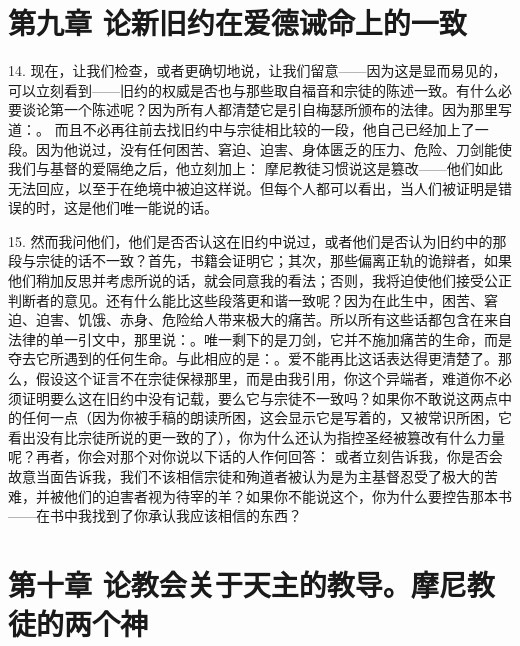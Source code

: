 
\section{第九章 论新旧约在爱德诫命上的一致}

14. 现在，让我们检查，或者更确切地说，让我们留意——因为这是显而易见的，可以立刻看到——旧约的权威是否也与那些取自福音和宗徒的陈述一致。有什么必要谈论第一个陈述呢？因为所有人都清楚它是引自梅瑟所颁布的法律。因为那里写道：。 而且不必再往前去找旧约中与宗徒相比较的一段，他自己已经加上了一段。因为他说过，没有任何困苦、窘迫、迫害、身体匮乏的压力、危险、刀剑能使我们与基督的爱隔绝之后，他立刻加上： 摩尼教徒习惯说这是篡改——他们如此无法回应，以至于在绝境中被迫这样说。但每个人都可以看出，当人们被证明是错误的时，这是他们唯一能说的话。\par

15. 然而我问他们，他们是否否认这在旧约中说过，或者他们是否认为旧约中的那段与宗徒的话不一致？首先，书籍会证明它；其次，那些偏离正轨的诡辩者，如果他们稍加反思并考虑所说的话，就会同意我的看法；否则，我将迫使他们接受公正判断者的意见。还有什么能比这些段落更和谐一致呢？因为在此生中，困苦、窘迫、迫害、饥饿、赤身、危险给人带来极大的痛苦。所以所有这些话都包含在来自法律的单一引文中，那里说：。唯一剩下的是刀剑，它并不施加痛苦的生命，而是夺去它所遇到的任何生命。与此相应的是：。爱不能再比这话表达得更清楚了。那么，假设这个证言不在宗徒保禄那里，而是由我引用，你这个异端者，难道你不必须证明要么这在旧约中没有记载，要么它与宗徒不一致吗？如果你不敢说这两点中的任何一点（因为你被手稿的朗读所困，这会显示它是写着的，又被常识所困，它看出没有比宗徒所说的更一致的了），你为什么还认为指控圣经被篡改有什么力量呢？再者，你会对那个对你说以下话的人作何回答： 或者立刻告诉我，你是否会故意当面告诉我，我们不该相信宗徒和殉道者被认为是为主基督忍受了极大的苦难，并被他们的迫害者视为待宰的羊？如果你不能说这个，你为什么要控告那本书——在书中我找到了你承认我应该相信的东西？\par


\section{第十章 论教会关于天主的教导。摩尼教徒的两个神}

